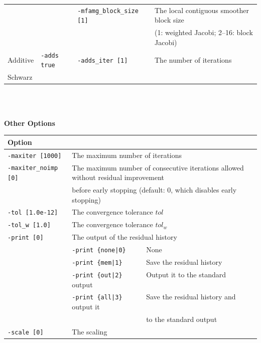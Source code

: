 \documentclass[a4paper]{article}
\begin{document}
\begin{minipage}[t]{\textwidth}
\begin{center}
\begin{tabular}{l|lll}
         &                       & \verb=-mfamg_block_size [1]= & The local contiguous smoother block size \\
         &                       &                              & (1: weighted Jacobi; 2--16: block Jacobi) \\
Additive & \verb=-adds true=     & \verb=-adds_iter [1]=       & The number of iterations   \\
Schwarz  &                       &                             &                            \\
\hline         
\end{tabular}
\end{center}
\end{minipage}
\\ \\
\newpage
\begin{minipage}[t]{\textwidth}
\begin{center}
{\bf Other Options}\\
\begin{tabular}{l|ll}\hline\hline
Option &                          \\ \hline
\verb=-maxiter [1000]= & The maximum number of iterations         \\
\verb=-maxiter_noimp [0]= & The maximum number of consecutive iterations allowed without residual improvement \\
                       & before early stopping (default: 0, which disables early stopping) \\
\verb=-tol [1.0e-12]=  & The convergence tolerance $tol$            \\
\verb=-tol_w [1.0]=    & The convergence tolerance $tol_w$  \\
\verb=-print [0]=      & The output of the residual history                \\
                       & \verb=-print {none|0}     =  None \\
                       & \verb=-print {mem|1}      =  Save the residual history\\
                       & \verb=-print {out|2}      =  Output it to the standard output\\
                       & \verb=-print {all|3}      =  Save the residual history and output it \\ 
                       & \verb=                    =  to the standard output \\
\verb=-scale [0]=      & The scaling \\

\end{tabular}
\end{center}
\end{minipage}
\end{document}
